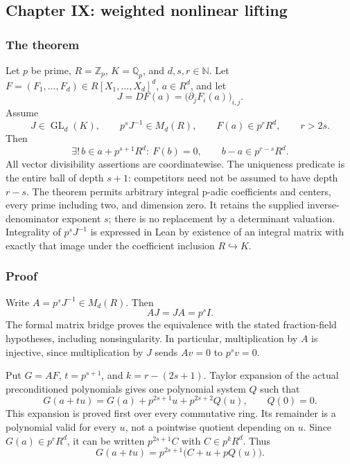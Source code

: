 \hypertarget{cont6:paper-ix-weighted-nonlinear-lifting}{%
\subsection{Chapter IX: weighted nonlinear
lifting}\label{cont6:paper-ix-weighted-nonlinear-lifting}}

\hypertarget{cont6:the-theorem}{%
\subsubsection{The theorem}\label{cont6:the-theorem}}

Let \(p\) be prime, \(R=\mathbb Z_p\), \(K=\mathbb Q_p\), and
\(d,s,r\in\mathbb N\). Let
\(F=(F_1,\ldots,F_d)\in R[X_1,\ldots,X_d]^d\), \(a\in R^d\), and let \[
J=DF(a)=\bigl(\partial_jF_i(a)\bigr)_{i,j}.
\] Assume \[
J\in\operatorname{GL}_d(K),\qquad p^sJ^{-1}\in M_d(R),\qquad
F(a)\in p^rR^d,\qquad r>2s.
\] Then \[
\boxed{\exists!\,b\in a+p^{s+1}R^d:\ F(b)=0,}
\qquad
\boxed{b-a\in p^{r-s}R^d.}
\] All vector divisibility assertions are coordinatewise. The uniqueness
predicate is the entire ball of depth \(s+1\): competitors need not be
assumed to have depth \(r-s\). The theorem permits arbitrary integral
p-adic coefficients and centers, every prime including two, and
dimension zero. It retains the supplied inverse-denominator exponent
\(s\); there is no replacement by a determinant valuation. Integrality
of \(p^sJ^{-1}\) is expressed in Lean by existence of an integral matrix
with exactly that image under the coefficient inclusion
\(R\hookrightarrow K\).

\hypertarget{cont6:proof}{%
\subsubsection{Proof}\label{cont6:proof}}

Write \(A=p^sJ^{-1}\in M_d(R)\). Then \[
AJ=JA=p^sI.
\] The formal matrix bridge proves the equivalence with the stated
fraction-field hypotheses, including nonsingularity. In particular,
multiplication by \(A\) is injective, since multiplication by \(J\)
sends \(Av=0\) to \(p^sv=0\).

Put \(G=AF\), \(t=p^{s+1}\), and \(k=r-(2s+1)\). Taylor expansion of the
actual preconditioned polynomials gives one polynomial system \(Q\) such
that \[
G(a+tu)=G(a)+p^{2s+1}u+p^{2s+2}Q(u),\qquad Q(0)=0.
\] This expansion is proved first over every commutative ring. Its
remainder is a polynomial valid for every \(u\), not a pointwise
quotient depending on \(u\). Since \(G(a)\in p^rR^d\), it can be written
\(p^{2s+1}C\) with \(C\in p^kR^d\). Thus \[
G(a+tu)=p^{2s+1}\bigl(C+u+pQ(u)\bigr).
\]

